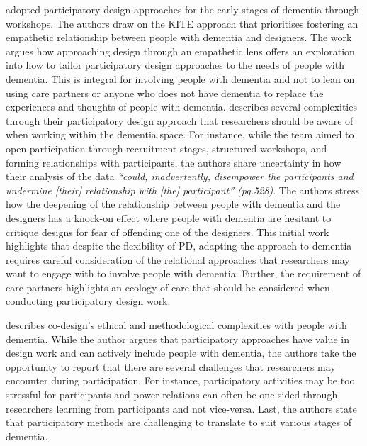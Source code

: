 \cite{lindsay_empathy_2012} adopted participatory design approaches for the early stages of dementia through workshops. The authors draw on the KITE approach that prioritises fostering an empathetic relationship between people with dementia and designers. The work argues how approaching design through an empathetic lens offers an exploration into how to tailor participatory design approaches to the needs of people with dementia. This is integral for involving people with dementia and not to lean on using care partners or anyone who does not have dementia to replace the experiences and thoughts of people with dementia. \cite{lindsay_empathy_2012}  describes several complexities through their participatory design approach that researchers should be aware of when working within the dementia space. For instance, while the team aimed to open participation through recruitment stages, structured workshops, and forming relationships with participants, the authors share uncertainty in how their analysis of the data \textit{``could, inadvertently, disempower the participants and undermine [their] relationship with [the] participant'' (pg.528)}. The authors stress how the deepening of the relationship between people with dementia and the designers has a knock-on effect where people with dementia are hesitant to critique designs for fear of offending one of the designers. This initial work highlights that despite the flexibility of PD, adapting the approach to dementia requires careful consideration of the relational approaches that researchers may want to engage with to involve people with dementia. Further, the requirement of care partners highlights an ecology of care that should be considered when conducting participatory design work.

\cite{hendriks_challenges_2014} describes co-design's ethical and methodological complexities with people with dementia. While the author argues that participatory approaches have value in design work and can actively include people with dementia, the authors take the opportunity to report that there are several challenges that researchers may encounter during participation. For instance, participatory activities may be too stressful for participants and power relations can often be one-sided through researchers learning from participants and not vice-versa. Last, the authors state that participatory methods are challenging to translate to suit various stages of dementia.

